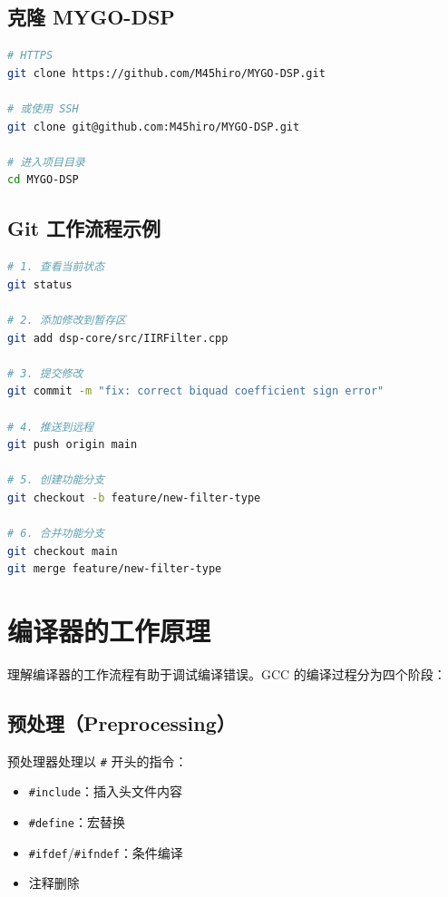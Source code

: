 ﻿\documentclass[12pt,a4paper,oneside]{ctexbook}
\begin{document}
\subsection{克隆 MYGO-DSP}

\begin{lstlisting}[language=bash, caption={克隆项目}]
# HTTPS
git clone https://github.com/M45hiro/MYGO-DSP.git

# 或使用 SSH
git clone git@github.com:M45hiro/MYGO-DSP.git

# 进入项目目录
cd MYGO-DSP
\end{lstlisting}

\subsection{Git 工作流程示例}

\begin{lstlisting}[language=bash, caption={日常 Git 工作流程}]
# 1. 查看当前状态
git status

# 2. 添加修改到暂存区
git add dsp-core/src/IIRFilter.cpp

# 3. 提交修改
git commit -m "fix: correct biquad coefficient sign error"

# 4. 推送到远程
git push origin main

# 5. 创建功能分支
git checkout -b feature/new-filter-type

# 6. 合并功能分支
git checkout main
git merge feature/new-filter-type
\end{lstlisting}

\section{编译器的工作原理}

理解编译器的工作流程有助于调试编译错误。GCC 的编译过程分为四个阶段：

\subsection{预处理（Preprocessing）}

预处理器处理以 \texttt{\#} 开头的指令：
\begin{itemize}
    \item \texttt{\#include}：插入头文件内容
    \item \texttt{\#define}：宏替换
    \item \texttt{\#ifdef}/\texttt{\#ifndef}：条件编译
    \item 注释删除
\end{itemize}
\end{document}
